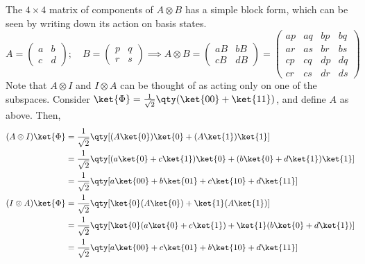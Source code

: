 The $4 \times 4$ matrix of components of $A \otimes B$ has a simple block form, which can be seen by writing down its action on basis states.
\[ A = \begin{pmatrix}
    a & b \\
    c & d
\end{pmatrix};\quad B = \begin{pmatrix}
    p & q \\
    r & s
\end{pmatrix} \implies A \otimes B = \begin{pmatrix}
    aB & bB \\
    cB & dB
\end{pmatrix} = \begin{pmatrix}
    ap & aq & bp & bq \\
    ar & as & br & bs \\
    cp & cq & dp & dq \\
    cr & cs & dr & ds
\end{pmatrix} \]
Note that $A \otimes I$ and $I \otimes A$ can be thought of as acting only on one of the subspaces.
Consider $\ket{\Phi} = \frac{1}{\sqrt{2}} \qty(\ket{00} + \ket{11})$, and define $A$ as above.
Then,
\begin{align*}
    (A \otimes I) \ket{\Phi} &= \frac{1}{\sqrt{2}} \qty[(A \ket{0}) \ket{0} + (A \ket{1}) \ket{1}] \\
    &= \frac{1}{\sqrt{2}} \qty[(a \ket{0} + c \ket{1}) \ket{0} + (b \ket{0} + d \ket{1}) \ket{1}] \\
    &= \frac{1}{\sqrt{2}} \qty[a \ket{00} + b \ket{01} + c \ket{10} + d \ket{11}] \\
    (I \otimes A) \ket{\Phi} &= \frac{1}{\sqrt{2}} \qty[\ket{0} (A \ket{0}) + \ket{1} (A \ket{1})] \\
    &= \frac{1}{\sqrt{2}} \qty[\ket{0} (a \ket{0} + c \ket{1}) + \ket{1} (b \ket{0} + d \ket{1})] \\
    &= \frac{1}{\sqrt{2}} \qty[a \ket{00} + c \ket{01} + b \ket{10} + d \ket{11}]
\end{align*}

